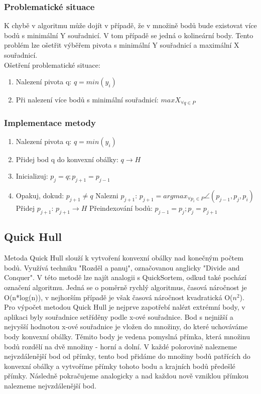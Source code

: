 \documentclass[a4paper, 12pt]{article}
\begin{document}
\subsubsection{Problematické situace}
K chybě v algoritmu může dojít v případě, že v množině bodů bude existovat více bodů s minimální Y souřadnicí. V tom případě se jedná o kolineární body. Tento problém lze ošetřit výběřem pivota s minimální Y souřadnicí a maximální X souřadnicí.\\

Ošetření problematické situace:
\begin{enumerate}
\item Nalezení pivota q:  $ q = min(y_i) $ 
\item Při nalezení více bodů s minimální souřadnicí: $max X_{ \forall q \in P}$
\end{enumerate}




\subsubsection{Implementace metody}
\begin{enumerate}
\item Nalezení pivota q:  $ q = min(y_i) $ 
\item Přidej bod q do konvexní obálky:  $ q \rightarrow H  $ 
\item Inicializuj: $p_j = q; p_{j+1} = p_{j-1}$
\item Opakuj, dokud: $ p_{j+1} \ne q $
\subitem Nalezni $p_{j+1}$: $ p_{j+1} = arg  max_{\forall p_i \in P}  \angle (p_{j-1}, p_j, p_i)$
\subitem Přidej $p_{j+1}$: $ p_{j+1} \rightarrow H  $
\subitem Přeindexování bodů: $ p_{j-1} = p_j; p_j = p_{j+1}  $
\end{enumerate}

\subsection{Quick Hull}
Metoda Quick Hull slouží k vytvoření konvexní obálky nad konečným počtem bodů. Využívá techniku "Rozděl a panuj", označovanou anglicky "Divide and Conquer". V této metodě lze najít analogii s QuickSortem, odkud také pochází označení algoritmu. Jedná se o poměrně rychlý algoritmus, časová náročnost je O(n*log(n)), v nejhorším případě je však časová náročnost kvadratická O($n^2$). \\

Pro výpočet metodou Quick Hull je nejprve zapotřebí nalézt extrémní body, v aplikaci byly souřadnice setříděny podle x-ové souřadnice. Bod s nejnižší a nejvyšší hodnotou x-ové souřadnice je vložen do množiny, do které uchováváme body konvexní obálky. Těmito body je vedena pomyslná přímka, která množinu bodů rozdělí na dvě množiny - horní a dolní. V každé polorovině nalezneme nejvzdálenější bod od přímky, tento bod přidáme do množiny bodů patřících do konvexní obálky a vytvoříme přímky tohoto bodu a krajních bodů předešlé přímky. Následně pokračujeme analogicky a nad každou nově vzniklou přímkou nalezneme nejvzdálenější bod.
\end{document}
